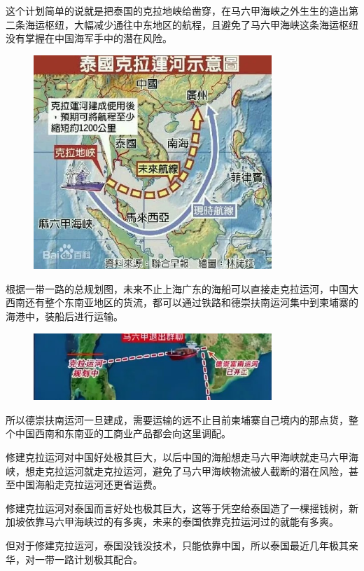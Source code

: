\documentclass[UTF8, 11pt, oneside]{ctexart}
\begin{document}
这个计划简单的说就是把泰国的克拉地峡给凿穿，在马六甲海峡之外生生的造出第二条海运枢纽，大幅减少通往中东地区的航程，且避免了马六甲海峡这条海运枢纽没有掌握在中国海军手中的潜在风险。

\begin{figure}[H]
    \centering
    \includegraphics[width=9cm]{2024-08-17-007.jpg}
\end{figure}

根据一带一路的总规划图，未来不止上海广东的海船可以直接走克拉运河，中国大西南还有整个东南亚地区的货流，都可以通过铁路和德崇扶南运河集中到柬埔寨的海港中，装船后进行运输。

\begin{figure}[H]
    \centering
    \includegraphics[width=9cm]{2024-08-17-008.jpg}
\end{figure}

所以德崇扶南运河一旦建成，需要运输的远不止目前柬埔寨自己境内的那点货，整个中国西南和东南亚的工商业产品都会向这里调配。

修建克拉运河对中国好处极其巨大，以后中国的海船想走马六甲海峡就走马六甲海峡，想走克拉运河就走克拉运河，避免了马六甲海峡物流被人截断的潜在风险，甚至中国海船走克拉运河还更省运费。

修建克拉运河对泰国而言好处也极其巨大，这等于凭空给泰国造了一棵摇钱树，新加坡依靠马六甲海峡过的有多爽，未来的泰国依靠克拉运河过的就能有多爽。

但对于修建克拉运河，泰国没钱没技术，只能依靠中国，所以泰国最近几年极其亲华，对一带一路计划极其配合。
\end{document}

